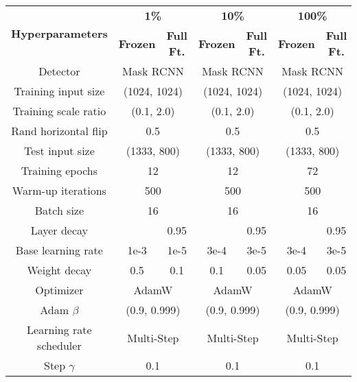 \documentclass{article}
\newcommand{\xmark}{\text{\ding{55}}}
\begin{document}
\begin{table}[h]\small
    \centering \begin{tabular}{c|cc|cc|cc}
    \toprule
    \multirow{2}{*}{\textbf{Hyperparameters}} & \multicolumn{2}{c|}{\textbf{1\%}} & \multicolumn{2}{c|}{\textbf{10\%}} & \multicolumn{2}{c}{\textbf{100\%}} \\
    & \textbf{Frozen} & \textbf{Full Ft.} & \textbf{Frozen} & \textbf{Full Ft.} & \textbf{Frozen} & \textbf{Full Ft.}\\
    \hline
    Detector & \multicolumn{2}{c|}{Mask RCNN} & \multicolumn{2}{c|}{Mask RCNN} & \multicolumn{2}{c}{Mask RCNN} \\
    Training input size & \multicolumn{2}{c|}{(1024, 1024)} & \multicolumn{2}{c|}{(1024, 1024)} & \multicolumn{2}{c}{(1024, 1024)} \\
    Training scale ratio & \multicolumn{2}{c|}{(0.1, 2.0)} & \multicolumn{2}{c|}{(0.1, 2.0)} & \multicolumn{2}{c}{(0.1, 2.0)} \\
    Rand horizontal flip & \multicolumn{2}{c|}{0.5} & \multicolumn{2}{c|}{0.5} & \multicolumn{2}{c}{0.5} \\
    Test input size & \multicolumn{2}{c|}{(1333, 800)} & \multicolumn{2}{c|}{(1333, 800)} & \multicolumn{2}{c}{(1333, 800)} \\
    \hline
    Training epochs & \multicolumn{2}{c|}{12} & \multicolumn{2}{c|}{12} & \multicolumn{2}{c}{72} \\
    Warm-up iterations & \multicolumn{2}{c|}{500} & \multicolumn{2}{c|}{500} & \multicolumn{2}{c}{500} \\
    Batch size & \multicolumn{2}{c|}{16} & \multicolumn{2}{c|}{16} & \multicolumn{2}{c}{16} \\
    Layer decay & \xmark & 0.95 & \xmark & 0.95 & \xmark & 0.95 \\
    Base learning rate & 1e-3 & 1e-5 & 3e-4 & 3e-5 & 3e-4 & 3e-5 \\
    Weight decay & 0.5 & 0.1 & 0.1 & 0.05 & 0.05 & 0.05 \\
    Optimizer & \multicolumn{2}{c|}{AdamW} & \multicolumn{2}{c|}{AdamW} & \multicolumn{2}{c}{AdamW} \\
    Adam $\beta$ & \multicolumn{2}{c|}{(0.9, 0.999)} & \multicolumn{2}{c|}{(0.9, 0.999)} & \multicolumn{2}{c}{(0.9, 0.999)} \\
    Learning rate scheduler & \multicolumn{2}{c|}{Multi-Step}  & \multicolumn{2}{c|}{Multi-Step}  & \multicolumn{2}{c}{Multi-Step}  \\
    Step $\gamma$ & \multicolumn{2}{c|}{0.1} & \multicolumn{2}{c|}{0.1} & \multicolumn{2}{c}{0.1} \\

\end{tabular}
\end{table}
\end{document}
